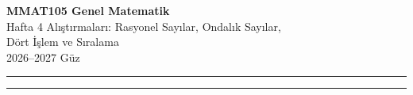 \documentclass[11pt,a4paper]{article}
\newcounter{alis}
\begin{document}
\begin{minipage}[c]{\textwidth}
{\LARGE\bfseries\color{anamavi} MMAT105 Genel Matematik}\\[4pt]
{\large Hafta 4 Alıştırmaları: Rasyonel Sayılar, Ondalık Sayılar,\\ Dört İşlem ve Sıralama}\\[6pt]
{\small 2026--2027 Güz}
\end{minipage}

\vspace{4pt}\noindent\textcolor{anamavi}{\rule{\textwidth}{1pt}}



\vspace{6pt}
\noindent\textcolor{anamavi}{\rule{\textwidth}{0.5pt}}\\
{\small }
\end{document}
